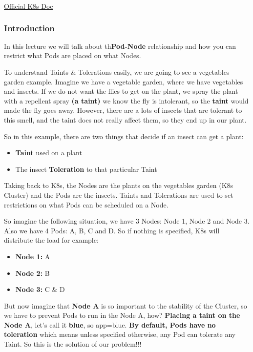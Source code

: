 \documentclass{article}
\begin{document}
\href{https://kubernetes.io/docs/concepts/scheduling-eviction/taint-and-toleration/}{Official K8s Doc}

\subsubsection{Introduction}

In this lecture we will talk about th\textbf{Pod-Node} relationship and how you can restrict what Pods are placed on what Nodes. 

To understand Taints \& Tolerations easily, we are going to see a vegetables garden example. Imagine we have a vegetable garden, where we have vegetables and insects. If we do not want the flies to get on the plant, we spray the plant with a repellent spray \textbf{(a taint)} we know the fly is intolerant, so the \textbf{taint} would made the fly goes away. However, there are a lots of insects that are tolerant to this smell, and the taint does not really affect them, so they end up in our plant.

So in this example, there are two things that decide if an insect can get a plant:

\begin{itemize}
    \item \textbf{Taint} used on a plant
    \item The insect \textbf{Toleration} to that particular Taint
\end{itemize}

Taking back to K8s, the Nodes are the plants on the vegetables garden (K8s Cluster) and the Pods are the insects. Taints and Tolerations are used to set restrictions on what Pods can be scheduled on a Node.

So imagine the following situation, we have 3 Nodes: Node 1, Node 2 and Node 3. Also we have 4 Pods: A, B, C and D. So if nothing is specified, K8s will distribute the load for example:

\begin{itemize}
    \item \textbf{Node 1:} A
    \item \textbf{Node 2:} B
    \item \textbf{Node 3:} C \& D
\end{itemize}

But now imagine that \textbf{Node A} is so important to the stability of the Cluster, so we have to prevent Pods to run in the Node A, how? \textbf{Placing a taint on the Node A}, let's call it \textbf{blue}, so app=blue. \textbf{By default, Pods have no toleration} which means unless specified otherwise, any Pod can tolerate any Taint. So this is the solution of our problem!!!
\end{document}
